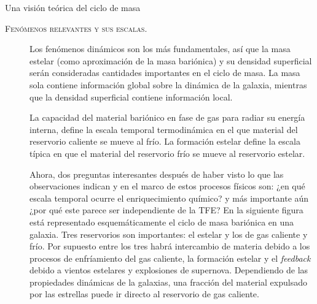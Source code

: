 \documentclass[xcolor=dvipsnames,4pt,hyperref={colorlinks,citecolor=black,linkcolor=black,urlcolor=black}]{beamer}
\begin{document}
\begin{frame}[allowframebreaks]{Una visión teórica del ciclo de masa}
%
\begin{description}
%
\item[\textsc{Fenómenos relevantes y sus escalas.}] Los fenómenos dinámicos son los más
fundamentales, así que la masa estelar (como aproximación de la masa bariónica) y su densidad
superficial serán consideradas cantidades importantes en el ciclo de masa. La masa sola contiene
información global sobre la dinámica de la galaxia, mientras que la densidad superficial contiene
información local.

La capacidad del material bariónico en fase de gas para radiar su energía interna, define la escala
temporal termodinámica en el que material del reservorio caliente se mueve al frío.
La formación estelar define la escala típica en que el material del reservorio frío se mueve al
reservorio estelar.

Ahora, dos preguntas interesantes después de haber visto lo que las observaciones indican y en el
marco de estos procesos físicos son:
%
¿en qué escala temporal ocurre el enriquecimiento químico?
%
y más importante aún ¿por qué este parece ser independiente de la TFE?
%
En la siguiente figura
está representado esquemáticamente el ciclo de masa bariónica en una galaxia. Tres reservorios son
importantes: el estelar y los de gas caliente y frío. Por supuesto entre los tres habrá intercambio
de materia debido a los procesos de enfríamiento del gas caliente, la formación estelar y el
\emph{feedback} debido a vientos estelares y explosiones de supernova. Dependiendo de las
propiedades dinámicas de la galaxias, una fracción del material expulsado por las estrellas puede ir
directo al reservorio de gas caliente.


\end{description}
\end{frame}
\end{document}
